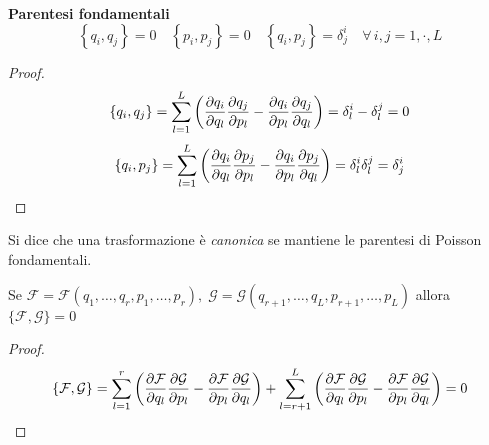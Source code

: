 \begin{proposition}
    \textbf{Parentesi fondamentali}
    \begin{equation}
        \left\{ q_i,q_j \right\}=0  \quad \left\{ p_i,p_j \right\}=0  \quad \left\{ q_i,p_j \right\}= \delta^i_j \quad \forall \,i,j= 1,\cdot, L 
    \end{equation}
\end{proposition}
\begin{proof}
    \begin{equation*}
        \left\{ q_i,q_j \right\}= \sum_{l=1}^{L}\left( \pdv{q_i}{q_l}\pdv{q_j}{p_l }-\pdv{q_i}{p_l}\pdv{q_j}{q_l} \right)=\delta^i_l-\delta^j_l=0
    \end{equation*}
    \begin{equation*}
        \left\{ q_i,p_j \right\}= \sum_{l=1}^{L}\left( \pdv{q_i}{q_l}\pdv{p_j}{p_l}-\pdv{q_i}{p_l}\pdv{p_j}{q_l} \right)= \delta^i_l \delta^j_l=\delta^i_j
    \end{equation*}
\end{proof}

\begin{definition}
    Si dice che una trasformazione è \textit{canonica} se mantiene le parentesi di Poisson fondamentali.
\end{definition}

\begin{proposition}
    Se $\mathcal{F}= \mathcal{F}(q_1,\dots,q_r,p_1,\dots,p_r ),\; 
    \mathcal{G}= \mathcal{G}(q_{r+1},\dots,q_L,p_{r+1},\dots,p_L)$ allora $\{\mathcal{F},\mathcal{G}\}=0$
\end{proposition}
\begin{proof}
    \begin{equation*}
        \{\mathcal{F},\mathcal{G}\}=
        \sum_{l=1}^r \left( 
            \pdv{\mathcal{F}}{q_l}\pdv{\mathcal{G}}{p_l}
            - \pdv{\mathcal{F}}{p_l}\pdv{\mathcal{G}}{q_l}
        \right)
        + \sum_{l=r+1}^L \left(
            \pdv{\mathcal{F}}{q_l}\pdv{\mathcal{G}}{p_l}
            - \pdv{\mathcal{F}}{p_l}\pdv{\mathcal{G}}{q_l}
        \right)=0
    \end{equation*}
\end{proof}


